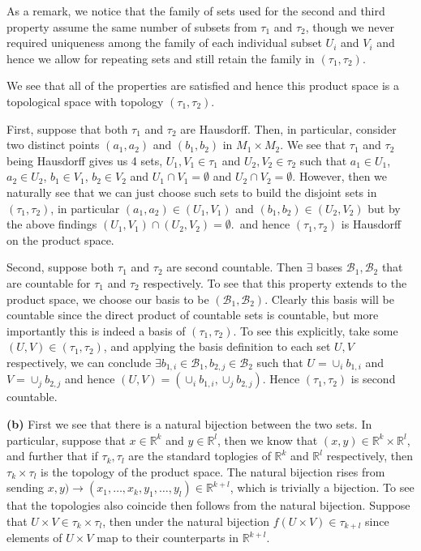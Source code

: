 \documentclass[10pt]{article}
\newcommand{\R}{\mathbb{R}}
\begin{document}
As a remark, we notice that the family of sets used for the second and third property assume the same number of subsets from $\tau_{1}$ and $\tau_{2}$, though we never required uniqueness among the family of each individual subset $U_{i}$ and $V_{i}$ and hence we allow for repeating sets and still retain the family in $(\tau_{1},\tau_{2})$.

We see that all of the properties are satisfied and hence this product space is a topological space with topology $(\tau_{1},\tau_{2})$. 

First, suppose that both $\tau_{1}$ and $\tau_{2}$ are Hausdorff. Then, in particular, consider two distinct points $(a_{1},a_{2})$ and $(b_{1},b_{2})$ in $M_{1} \times M_{2}$. We see that $\tau_{1}$ and $\tau_{2}$ being Hausdorff gives us 4 sets, $U_{1},V_{1} \in \tau_{1}$ and $U_{2},V_{2}\in \tau_{2}$ such that $a_{1}\in U_{1}$, $a_{2} \in U_{2}$, $b_{1} \in V_{1}$, $b_{2} \in V_{2}$ and $U_{1}\cap V_{1} = \emptyset$ and $U_{2}\cap V_{2} = \emptyset$. However, then we naturally see that we can just choose such sets to build the disjoint sets in $(\tau_{1},\tau_{2})$, in particular $(a_{1},a_{2}) \in (U_{1},V_{1})$ and $(b_{1},b_{2}) \in (U_{2}, V_{2})$ but by the above findings $(U_{1},V_{1}) \cap (U_{2}, V_{2}) = \emptyset$.\, and hence $(\tau_{1},\tau_{2})$ is Hausdorff on the product space.

Second, suppose both $\tau_{1}$ and $\tau_{2}$ are second countable. Then $\exists$ bases $\mathcal{B}_{1},\mathcal{B}_{2}$ that are countable for $\tau_{1}$ and $\tau_{2}$ respectively. To see that this property extends to the product space, we choose our basis to be $(\mathcal{B}_{1},\mathcal{B}_{2})$. Clearly this basis will be countable since the direct product of countable sets is countable, but more importantly this is indeed a basis of $(\tau_{1},\tau_{2})$. To see this explicitly, take some $(U,V)\in (\tau_{1},\tau_{2})$, and applying the basis definition to each set $U,V$ respectively, we can conclude $\exists b_{1,i}\in \mathcal{B}_{1},b_{2,j}\in\mathcal{B}_{2}$ such that $U = \cup_{i}b_{1,i}$ and $V = \cup_{j}b_{2,j}$ and hence $(U,V) = (\cup_{i}b_{1,i},\cup_{j}b_{2,j})$. Hence $(\tau_{1},\tau_{2})$ is second countable.

\textbf{(b)} First we see that there is a natural bijection between the two sets. In particular, suppose that $x\in \R^{k}$ and $y\in \R^{l}$, then we know that $(x,y)\in \R^{k} \times \R^{l}$, and further that if $\tau_{k}, \tau_{l}$ are the standard toplogies of $\R^{k}$ and $\R^{l}$ respectively, then $\tau_{k}\times\tau_{l}$ is the topology of the product space. The natural bijection rises from sending $x,y) \to (x_{1}, \dots, x_{k},y_{1}, \dots, y_{l})\in \R^{k+l}$, which is trivially a bijection. To see that the topologies also coincide then follows from the natural bijection. Suppose that $U\times V \in \tau_{k}\times \tau_{l}$, then under the natural bijection $f(U\times V)\in \tau_{k+l}$ since elements of $U\times V$ map to their counterparts in $\R^{k+l}$.
\end{document}
